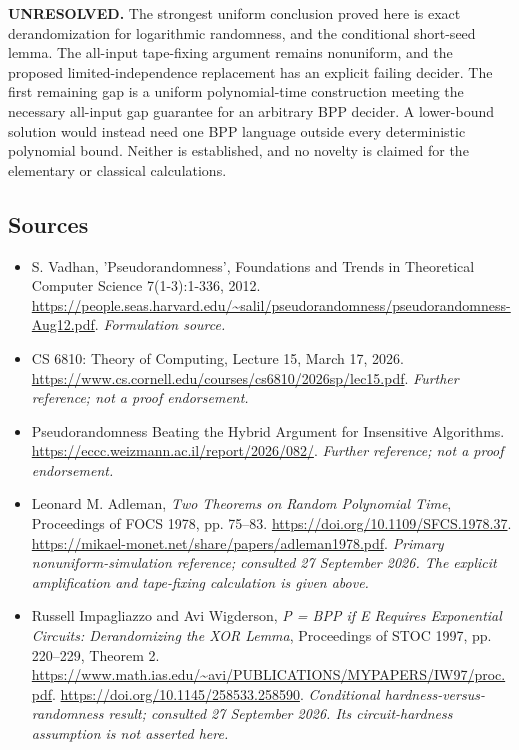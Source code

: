 \documentclass[11pt]{article}
\begin{document}
\textbf{UNRESOLVED.} The strongest uniform conclusion proved here is exact
derandomization for logarithmic randomness, and the conditional short-seed
lemma. The all-input tape-fixing argument remains nonuniform, and the proposed
limited-independence replacement has an explicit failing decider. The first
remaining gap is a uniform polynomial-time construction meeting the necessary
all-input gap guarantee for an arbitrary BPP decider. A lower-bound solution
would instead need one BPP language outside every deterministic polynomial
bound. Neither is established, and no novelty is claimed for the elementary
or classical calculations.

\subsection{Sources}
\begin{itemize}
\item[S1]S. Vadhan, 'Pseudorandomness', Foundations and Trends in Theoretical Computer Science 7(1-3):1-336, 2012.
\url{https://people.seas.harvard.edu/~salil/pseudorandomness/pseudorandomness-Aug12.pdf}.
\textit{Formulation source.}
\item[S2]CS 6810: Theory of Computing, Lecture 15, March 17, 2026.
\url{https://www.cs.cornell.edu/courses/cs6810/2026sp/lec15.pdf}.
\textit{Further reference; not a proof endorsement.}
\item[S3]Pseudorandomness Beating the Hybrid Argument for Insensitive Algorithms.
\url{https://eccc.weizmann.ac.il/report/2026/082/}.
\textit{Further reference; not a proof endorsement.}
\item[E1]Leonard M. Adleman, \emph{Two Theorems on Random Polynomial Time},
Proceedings of FOCS 1978, pp. 75--83.
\url{https://doi.org/10.1109/SFCS.1978.37}.
\url{https://mikael-monet.net/share/papers/adleman1978.pdf}.
\textit{Primary nonuniform-simulation reference; consulted 27 September 2026.
The explicit amplification and tape-fixing calculation is given above.}
\item[E2]Russell Impagliazzo and Avi Wigderson,
\emph{P = BPP if E Requires Exponential Circuits: Derandomizing the XOR Lemma},
Proceedings of STOC 1997, pp. 220--229, Theorem 2.
\url{https://www.math.ias.edu/~avi/PUBLICATIONS/MYPAPERS/IW97/proc.pdf}.
\url{https://doi.org/10.1145/258533.258590}.
\textit{Conditional hardness-versus-randomness result; consulted
27 September 2026. Its circuit-hardness assumption is not asserted here.}
\end{itemize}
\end{document}

